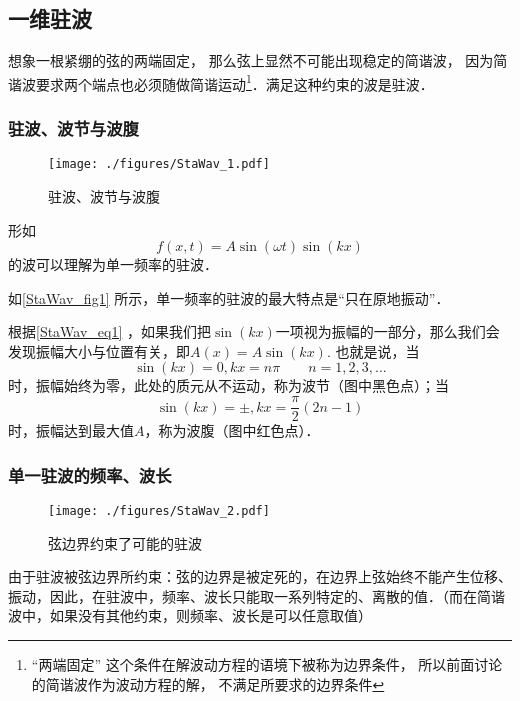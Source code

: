 
\begin{issues}
\issueDraft
\end{issues}


\subsection{一维驻波}
想象一根紧绷的弦的两端固定， 那么弦上显然不可能出现稳定的简谐波， 因为简谐波要求两个端点也必须随做简谐运动\footnote{“两端固定” 这个条件在解波动方程的语境下被称为边界条件， 所以前面讨论的简谐波作为波动方程的解， 不满足所要求的边界条件}．满足这种约束的波是驻波．

\subsubsection{驻波、波节与波腹}
\begin{figure}[ht]
\centering
\texttt{[image: ./figures/StaWav\_1.pdf]}
\caption{驻波、波节与波腹} \label{StaWav_fig1}
\end{figure}

形如
\begin{equation}\label{StaWav_eq1}
f(x,t)=A\sin(\omega t)\sin(kx)
\end{equation}
的波可以理解为单一频率的驻波．

如\autoref{StaWav_fig1} 所示，单一频率的驻波的最大特点是“只在原地振动”．

根据\autoref{StaWav_eq1} ，如果我们把$\sin(kx)$一项视为振幅的一部分，那么我们会发现振幅大小与位置有关，即$A(x) = A \sin(kx)$. 也就是说，当$$\sin(kx)=0, kx=n\pi \qquad n=1,2,3,...$$时，振幅始终为零，此处的质元从不运动，称为波节（图中黑色点）；当$$\sin(kx)=\pm, kx=\frac{\pi}{2} (2n-1)$$时，振幅达到最大值$A$，称为波腹（图中红色点）．

\subsubsection{单一驻波的频率、波长}
\begin{figure}[ht]
\centering
\texttt{[image: ./figures/StaWav\_2.pdf]}
\caption{弦边界约束了可能的驻波} \label{StaWav_fig2}
\end{figure}

由于驻波被弦边界所约束：弦的边界是被定死的，在边界上弦始终不能产生位移、振动，因此，在驻波中，频率、波长只能取一系列特定的、离散的值．（而在简谐波中，如果没有其他约束，则频率、波长是可以任意取值）

